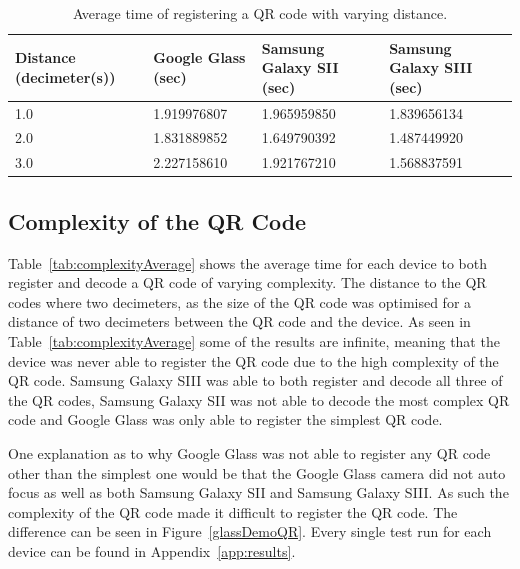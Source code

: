 	\begin{table}[H]%
    		\caption{Average time of registering a QR code with varying distance.} \label{tab:distanceAverage}
		\centering \begin{tabularx}{\textwidth}{X|X|X|X} \hline
		\textbf{Distance (decimeter(s))} & \textbf{Google Glass (sec)} & \textbf{Samsung Galaxy SII (sec)} & \textbf{Samsung Galaxy SIII (sec)} \\ \hline \hline
       
		1.0	&1.919976807	&1.965959850	&1.839656134	\\ \hline
		2.0	&1.831889852	&1.649790392	&1.487449920	\\ \hline
		3.0	&2.227158610	&1.921767210	&1.568837591	\\ \hline
		
		\end{tabularx}
	\end{table}

\subsection{Complexity of the QR Code}

Table~\ref{tab:complexityAverage} shows the average time for each device to both register and decode a QR code of varying complexity. The distance to the QR codes where two decimeters, as the size of the QR code was optimised for a distance of two decimeters between the QR code and the device. As seen in Table~\ref{tab:complexityAverage} some of the results are infinite, meaning that the device was never able to register the QR code due to the high complexity of the QR code. Samsung Galaxy SIII was able to both register and decode all three of the QR codes, Samsung Galaxy SII was not able to decode the most complex QR code and Google Glass was only able to register the simplest QR code.

One explanation as to why Google Glass was not able to register any QR code other than the simplest one would be that the Google Glass camera did not auto focus as well as both Samsung Galaxy SII and Samsung Galaxy SIII. As such the complexity of the QR code made it difficult to register the QR code. The difference can be seen in Figure~\ref{glassDemoQR}. Every single test run for each device can be found in Appendix~\ref{app:results}.

